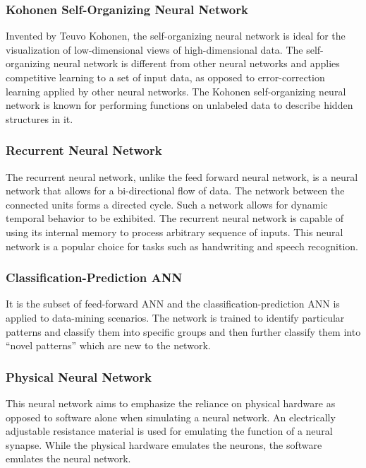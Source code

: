 \subsubsection{Kohonen Self-Organizing Neural Network}

Invented by Teuvo Kohonen, the self-organizing neural network is ideal for the visualization of low-dimensional views of high-dimensional data. The self-organizing neural network is different from other neural networks and applies competitive learning to a set of input data, as opposed to error-correction learning applied by other neural networks. The Kohonen self-organizing neural network is known for performing functions on unlabeled data to describe hidden structures in it.

\subsubsection{Recurrent Neural Network}

The recurrent neural network, unlike the feed forward neural network, is a neural network that allows for a bi-directional flow of data. The network between the connected units forms a directed cycle. Such a network allows for dynamic temporal behavior to be exhibited. The recurrent neural network is capable of using its internal memory to process arbitrary sequence of inputs. This neural network is a popular choice for tasks such as handwriting and speech recognition.

\subsubsection{Classification-Prediction ANN}

It is the subset of feed-forward ANN and the classification-prediction ANN is applied to data-mining scenarios. The network is trained to identify particular patterns and classify them into specific groups and then further classify them into “novel patterns” which are new to the network.

\subsubsection{Physical Neural Network}

This neural network aims to emphasize the reliance on physical hardware as opposed to software alone when simulating a neural network. An electrically adjustable resistance material is used for emulating the function of a neural synapse. While the physical hardware emulates the neurons, the software emulates the neural network.

